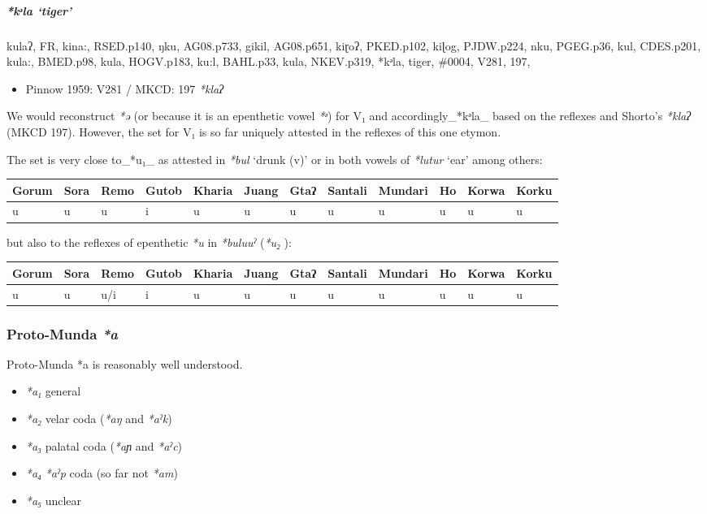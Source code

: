 \documentclass[a4paper,]{article}
\providecommand{\tightlist}{%
  \setlength{\itemsep}{0pt}\setlength{\parskip}{0pt}}
\let\oldsubparagraph\subparagraph
\renewcommand{\subparagraph}[1]{\oldsubparagraph{#1}\mbox{}}
\begin{document}
\subparagraph{\texorpdfstring{\emph{*kᵊla}
`tiger'}{*kᵊla tiger}}\label{kux1d4ala-tiger}

kulaʔ, FR, kina:, RSED.p140, ŋku, AG08.p733, gikil, AG08.p651, kiɽoʔ,
PKED.p102, kiɭog, PJDW.p224, nku, PGEG.p36, kul, CDES.p201, kula:,
BMED.p98, kula, HOGV.p183, ku:l, BAHL.p33, kula, NKEV.p319, *kᵊla,
tiger, \#0004, V281, 197,

\begin{itemize}
\tightlist
\item
  Pinnow 1959: V281 / MKCD: 197 \emph{*klaʔ}
\end{itemize}

We would reconstruct \emph{*ə} (or because it is an epenthetic vowel
\emph{*ᵊ}) for V₁ and accordingly\_*kᵊla\_ based on the reflexes and
Shorto's \emph{*klaʔ} (MKCD 197). However, the set for V₁ is so far
uniquely attested in the reflexes of this one etymon.

The set is very close to\_*u₁\_ as attested in \emph{*bul} `drunk (v)'
or in both vowels of \emph{*lutur} `ear' among others:

\begin{longtable}[]{@{}llllllllllll@{}}
\toprule
Gorum & Sora & Remo & Gutob & Kharia & Juang & Gtaʔ & Santali & Mundari
& Ho & Korwa & Korku\tabularnewline
\midrule
\endhead
u & u & u & i & u & u & u & u & u & u & u & u\tabularnewline
\bottomrule
\end{longtable}

but also to the reflexes of epenthetic \emph{*u} in \emph{*buluuˀ}
(\emph{*u₂} ):

\begin{longtable}[]{@{}llllllllllll@{}}
\toprule
Gorum & Sora & Remo & Gutob & Kharia & Juang & Gtaʔ & Santali & Mundari
& Ho & Korwa & Korku\tabularnewline
\midrule
\endhead
u & u & u/i & i & u & u & u & u & u & u & u & u\tabularnewline
\bottomrule
\end{longtable}

\subsubsection{\texorpdfstring{Proto-Munda
\emph{*a}}{Proto-Munda *a}}\label{proto-munda-a}

Proto-Munda *a is reasonably well understood.

\begin{itemize}
\tightlist
\item
  \emph{*a₁} general
\item
  \emph{*a₂} velar coda (\emph{*aŋ} and \emph{*aˀk})
\item
  \emph{*a₃} palatal coda (\emph{*aɲ} and \emph{*aˀc})
\item
  \emph{*a₄} \emph{*aˀp} coda (so far not \emph{*am})
\item
  \emph{*a₅} unclear
\end{itemize}
\end{document}
